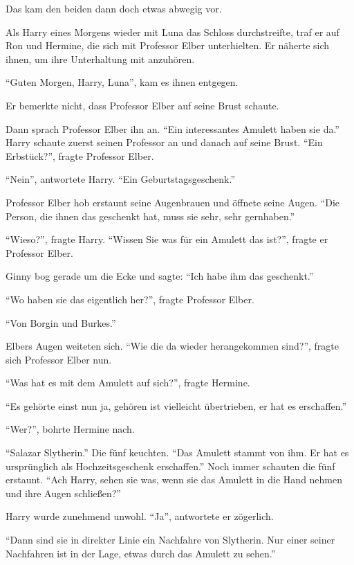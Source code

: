 Das kam den beiden dann doch etwas abwegig vor.

\trenn

Als Harry eines Morgens wieder mit Luna das Schloss durchstreifte, traf er auf Ron und Hermine, die sich mit Professor Elber unterhielten. Er näherte sich ihnen, um ihre Unterhaltung mit anzuhören.

\enquote{Guten Morgen, Harry, Luna}, kam es ihnen entgegen.

Er bemerkte nicht, dass Professor Elber auf seine Brust schaute.

Dann sprach Professor Elber ihn an. \enquote{Ein interessantes Amulett haben sie da.} Harry schaute zuerst seinen Professor an und danach auf seine Brust. \enquote{Ein Erbstück?}, fragte Professor Elber.

\enquote{Nein}, antwortete Harry. \enquote{Ein Geburtstagsgeschenk.}

Professor Elber hob erstaunt seine Augenbrauen und öffnete seine Augen. \enquote{Die Person, die ihnen das geschenkt hat, muss sie sehr, sehr gernhaben.}

\enquote{Wieso?}, fragte Harry. \enquote{Wissen Sie was für ein Amulett das ist?}, fragte er Professor Elber.

Ginny bog gerade um die Ecke und sagte: \enquote{Ich habe ihm das geschenkt.}

\enquote{Wo haben sie das eigentlich her?}, fragte Professor Elber.

\enquote{Von Borgin und Burkes.}

Elbers Augen weiteten sich. \enquote{Wie die da wieder herangekommen sind?}, fragte sich Professor Elber nun.

\enquote{Was hat es mit dem Amulett auf sich?}, fragte Hermine.

\enquote{Es gehörte einst \gst nun ja, gehören ist vielleicht übertrieben, er hat es erschaffen.}

\enquote{Wer?}, bohrte Hermine nach.

\enquote{Salazar Slytherin.} Die fünf keuchten. \enquote{Das Amulett stammt von ihm. Er hat es ursprünglich als Hochzeitsgeschenk erschaffen.} Noch immer schauten die fünf erstaunt. \enquote{Ach Harry, sehen sie was, wenn sie das Amulett in die Hand nehmen und ihre Augen schließen?}

Harry wurde zunehmend unwohl. \enquote{Ja}, antwortete er zögerlich.

\enquote{Dann sind sie in direkter Linie ein Nachfahre von Slytherin. Nur einer seiner Nachfahren ist in der Lage, etwas durch das Amulett zu sehen.}

